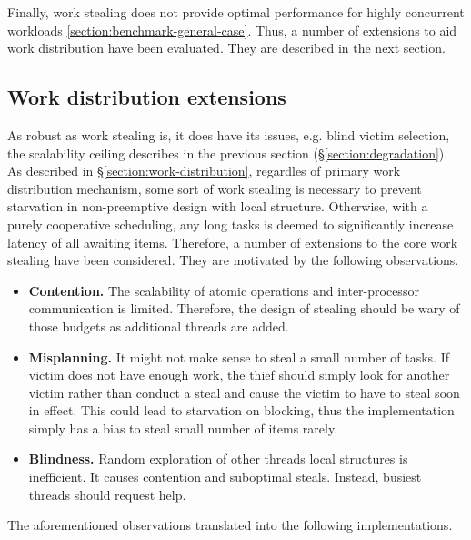 \documentclass[12pt,a4paper,twoside]{report}
\begin{document}
Finally, work stealing does not provide optimal performance for highly concurrent workloads \ref{section:benchmark-general-case}. Thus, a number of extensions to aid work distribution have been evaluated. They are described in the next section.

\subsection{Work distribution extensions}
\label{section:work-distribution-extensions}

As robust as work stealing is, it does have its issues, e.g. blind victim selection, the scalability ceiling describes in the previous section (\S\ref{section:degradation}). 
As described in \S\ref{section:work-distribution}, regardles of primary work distribution mechanism, some sort of work stealing is necessary to prevent starvation in non-preemptive design with local structure. Otherwise, with a purely cooperative scheduling, any long tasks is deemed to significantly increase latency of all awaiting items. Therefore, a number of extensions to the core work stealing have been considered. They are motivated by the following observations.

\begin{itemize}
    \item \textbf{Contention.} The scalability of atomic operations and inter-processor communication is limited. Therefore, the design of stealing should be wary of those budgets as additional threads are added. 
    \item \textbf{Misplanning.} It might not make sense to steal a small number of tasks. If victim does not have enough work, the thief should simply look for another victim rather than conduct a steal and cause the victim to have to steal soon in effect. This could lead to starvation on blocking, thus the implementation simply has a bias to steal small number of items rarely. 
    \item \textbf{Blindness.} Random exploration of other threads local structures is inefficient. It causes contention and suboptimal steals. Instead, busiest threads should request help. 
\end{itemize}

The aforementioned observations translated into the following implementations. 
\end{document}
